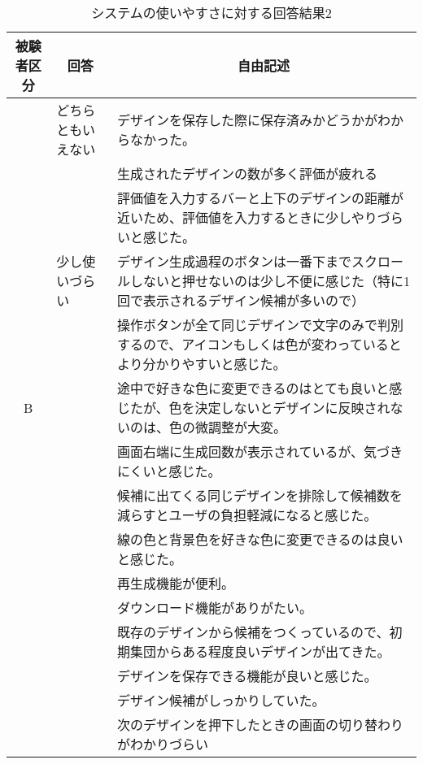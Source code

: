 \begin{table}[htbp]
    \centering
    \caption{システムの使いやすさに対する回答結果2}
    \begin{tabular}{|c|p{7em}|p{26em}|} \hline
        被験者区分 & \multicolumn{1}{|c|}{回答} & \multicolumn{1}{|c|}{自由記述} \\ \hline
        
         & どちらともいえない& デザインを保存した際に保存済みかどうかがわからなかった。\\\cline{3-3}
         & & 生成されたデザインの数が多く評価が疲れる\\\cline{3-3}
          & & 評価値を入力するバーと上下のデザインの距離が近いため、評価値を入力するときに少しやりづらいと感じた。\\ \cline{2-3}
         &少し使いづらい & デザイン生成過程のボタンは一番下までスクロールしないと押せないのは少し不便に感じた（特に1回で表示されるデザイン候補が多いので）\\\cline{3-3}
         & & 操作ボタンが全て同じデザインで文字のみで判別するので、アイコンもしくは色が変わっているとより分かりやすいと感じた。\\\cline{3-3}
        B & & 途中で好きな色に変更できるのはとても良いと感じたが、色を決定しないとデザインに反映されないのは、色の微調整が大変。\\\cline{3-3}
         & & 画面右端に生成回数が表示されているが、気づきにくいと感じた。\\\cline{3-3}
         & & 候補に出てくる同じデザインを排除して候補数を減らすとユーザの負担軽減になると感じた。\\\cline{3-3}
         & & 線の色と背景色を好きな色に変更できるのは良いと感じた。\\\cline{3-3}
         & &再生成機能が便利。\\\cline{3-3}
         & &ダウンロード機能がありがたい。\\\cline{3-3}
         & & 既存のデザインから候補をつくっているので、初期集団からある程度良いデザインが出てきた。\\\cline{3-3}
         & & デザインを保存できる機能が良いと感じた。\\\cline{3-3}
         & & デザイン候補がしっかりしていた。\\\cline{3-3}
         & & 次のデザインを押下したときの画面の切り替わりがわかりづらい\\ \hline
        
        

    \end{tabular}
    \label{free4}
\end{table}

